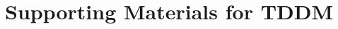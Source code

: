 \chapter{Supporting Materials for TDDM}

\label{sec:tddm-Proofs}
\label{sec:tddm-ObjTimeRevProof}
\label{sec:tddm-ApdxTrainingObjective}
\label{sec:tddm-ApdxDiffGuide}
\label{sec:tddm-ExperimentDetails}





